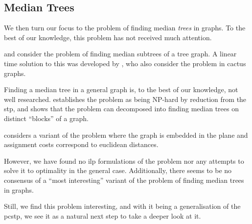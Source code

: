  \subsection{Median Trees}\label{sec:related:mtp}
 We then turn our focus to the problem of finding median \textit{trees} in graphs.
  To the best of our knowledge, this problem has not received much attention.

  \citet{minieka1985optimal} and \citet{george2003bi} consider the problem of finding
  median subtrees of a tree graph.
  A linear time solution to this was developed by
  \citet{kim1991locating}, who also consider the problem in cactus graphs.

  Finding a median tree in a general graph is, to the best of our knowledge, not well researched.
 \citet{aneja1992location} establishes the
  problem as being NP-hard by reduction from the \gls{stp}, and shows that the problem can
  decomposed into finding median trees on distinct ``blocks'' of a graph.

  \citet{kim1991locating} considers a variant of the problem where the graph is embedded in the plane
  and assignment costs correspond to euclidean distances.
  
  However, we have found no \gls{ilp} formulations of the problem nor any attempts to solve it to optimality
  in the general case. Additionally, there seems to be no consensus of a ``most interesting'' variant
  of the problem of finding median trees in graphs.

  Still, we find this problem interesting, and with it being a generalisation of the
  \gls{pcstp}, we see it as a natural next step to take a deeper look at it.


